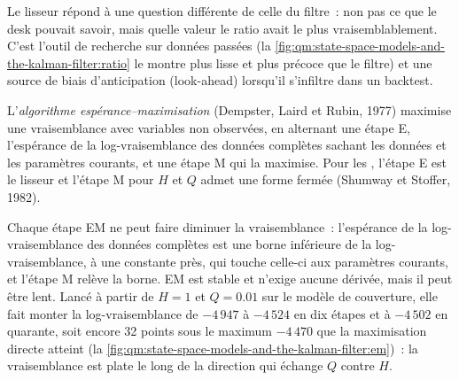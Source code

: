 Le lisseur répond à une question différente de celle du filtre~: non pas ce que le desk pouvait savoir, mais quelle valeur le ratio avait le plus vraisemblablement. C'est l'outil de
recherche sur données passées (la \cref{fig:qm:state-space-models-and-the-kalman-filter:ratio} le montre plus lisse et plus précoce que le filtre) et une source de biais d'anticipation
(look-ahead) lorsqu'il s'infiltre dans un backtest.

\begin{definition}\label{def:qm:state-space-models-and-the-kalman-filter:em}
L'\emph{algorithme espérance--maximisation} (Dempster, Laird et Rubin, 1977) maximise une vraisemblance avec
variables non observées, en alternant une étape E, l'espérance de la log-vraisemblance des données complètes sachant les données et les paramètres courants, et une étape M qui
la maximise. Pour les , l'étape E est le lisseur et l'étape M pour $H$ et $Q$ admet une forme fermée (Shumway et Stoffer, 1982).
\end{definition}

Chaque étape EM ne peut faire diminuer la vraisemblance~: l'espérance de la log-vraisemblance des données complètes est une borne inférieure de la log-vraisemblance, à une constante près, qui
touche celle-ci aux paramètres courants, et l'étape M relève la borne. EM est stable et n'exige aucune dérivée, mais il peut être lent. Lancé à partir de $H = 1$ et $Q =
0.01$ sur le modèle de couverture, elle fait monter la log-vraisemblance de $-4\,947$ à $-4\,524$ en dix étapes et à $-4\,502$ en quarante, soit encore 32 points sous le maximum
$-4\,470$ que la maximisation directe atteint (la \cref{fig:qm:state-space-models-and-the-kalman-filter:em})~: la vraisemblance est plate le long de la direction qui échange $Q$
contre $H$.


